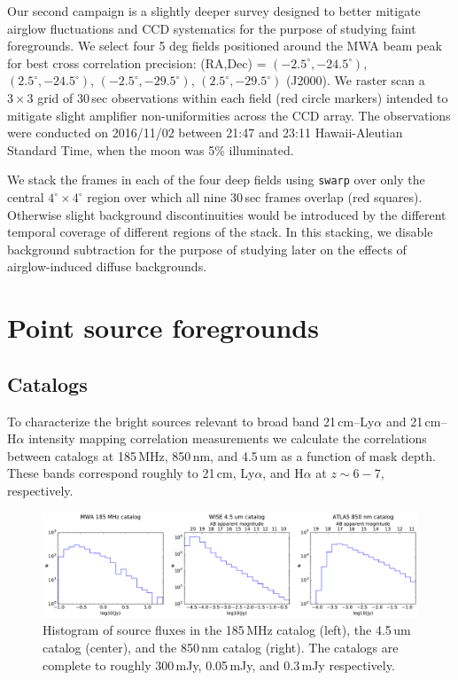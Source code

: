 \documentclass{emulateapj}
\begin{document}

Our second campaign is a slightly deeper survey designed to better mitigate airglow fluctuations and CCD systematics for the purpose of studying faint foregrounds. We select four 5 deg fields positioned around the MWA beam peak for best cross correlation precision: (RA,Dec) = $(-2.5^\circ, -24.5^\circ)$, $(2.5^\circ, -24.5^\circ)$, $(-2.5^\circ, -29.5^\circ)$, $(2.5^\circ, -29.5^\circ)$ (J2000). We raster scan a $3\times3$ grid of 30\,sec observations within each field (red circle markers) intended to mitigate slight amplifier non-uniformities across the CCD array. The observations were conducted on 2016/11/02 between 21:47 and 23:11 Hawaii-Aleutian Standard Time, when the moon was 5\% illuminated. 

We stack the frames in each of the four deep fields using {\tt swarp} over only the central $4^\circ\times 4^\circ$ region over which all nine 30\,sec frames overlap (red squares). Otherwise slight background discontinuities would be introduced by the different temporal coverage of different regions of the stack. In this stacking, we disable background subtraction for the purpose of studying later on the effects of airglow-induced diffuse backgrounds.

\section{Point source foregrounds}

\subsection{Catalogs}
\label{sec:catalogs}

To characterize the bright sources relevant to broad band  21\,cm--Ly$\alpha$ and  21\,cm--H$\alpha$ intensity mapping correlation measurements we calculate the correlations between catalogs at 185\,MHz, 850\,nm, and 4.5\,um as a function of mask depth. These bands correspond roughly to 21\,cm, Ly$\alpha$, and H$\alpha$ at $z\sim6-7$, respectively. 

\begin{figure}[t]
\centering
\includegraphics[width=6.5in]{images/catalog_histograms.pdf}
\caption{Histogram of source fluxes in the 185\,MHz catalog (left), the 4.5\,um catalog (center), and the 850\,nm catalog (right). The catalogs are complete to roughly 300\,mJy, 0.05\,mJy, and 0.3\,mJy respectively.}
\label{fig:cataloghistograms}
\end{figure}
\end{document}
